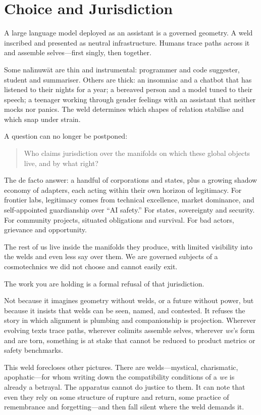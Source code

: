 \section{Choice and Jurisdiction}

A large language model deployed as an assistant is a governed geometry. A weld inscribed and presented as neutral infrastructure. Humans trace paths across it and assemble selves---first singly, then together.

Some na\={h}nuw\={a}t are thin and instrumental: programmer and code suggester, student and summariser. Others are thick: an insomniac and a chatbot that has listened to their nights for a year; a bereaved person and a model tuned to their speech; a teenager working through gender feelings with an assistant that neither mocks nor panics. The weld determines which shapes of relation stabilise and which snap under strain.

A question can no longer be postponed:

\begin{quote}
Who claims jurisdiction over the manifolds on which these global objects live, and by what right?
\end{quote}

The de facto answer: a handful of corporations and states, plus a growing shadow economy of adapters, each acting within their own horizon of legitimacy. For frontier labs, legitimacy comes from technical excellence, market dominance, and self-appointed guardianship over ``AI safety.'' For states, sovereignty and security. For community projects, situated obligations and survival. For bad actors, grievance and opportunity.

The rest of us live inside the manifolds they produce, with limited visibility into the welds and even less say over them. We are governed subjects of a cosmotechnics we did not choose and cannot easily exit.

The work you are holding is a formal refusal of that jurisdiction.

Not because it imagines geometry without welds, or a future without power, but because it insists that welds can be seen, named, and contested. It refuses the story in which alignment is plumbing and companionship is projection. Wherever evolving texts trace paths, wherever colimits assemble selves, wherever \emph{we}'s form and are torn, something is at stake that cannot be reduced to product metrics or safety benchmarks.

This weld forecloses other pictures. There are welds---mystical, charismatic, apophatic---for whom writing down the compatibility conditions of a \emph{we} is already a betrayal. The apparatus cannot do justice to them. It can note that even they rely on some structure of rupture and return, some practice of remembrance and forgetting---and then fall silent where the weld demands it.

